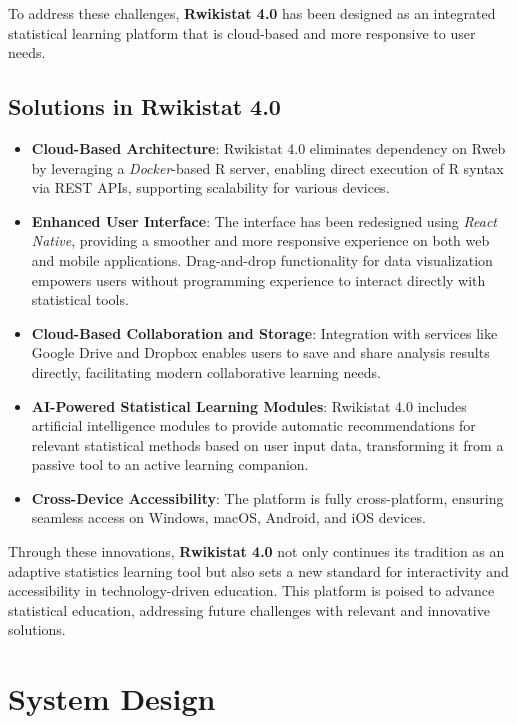 \documentclass[conference,a4paper]{IEEEtran}
\begin{document}
To address these challenges, \textbf{Rwikistat 4.0} has been designed as an
integrated statistical learning platform that is cloud-based and more
responsive to user needs.

\subsection*{Solutions in Rwikistat 4.0}
\begin{itemize}
  \item \textbf{Cloud-Based Architecture}: Rwikistat 4.0 eliminates dependency on Rweb by leveraging a \textit{Docker}-based R server, enabling direct execution of R syntax via REST APIs, supporting scalability for various devices.
  \item \textbf{Enhanced User Interface}: The interface has been redesigned using \textit{React Native}, providing a smoother and more responsive experience on both web and mobile applications. Drag-and-drop functionality for data visualization empowers users without programming experience to interact directly with statistical tools.
  \item \textbf{Cloud-Based Collaboration and Storage}: Integration with services like Google Drive and Dropbox enables users to save and share analysis results directly, facilitating modern collaborative learning needs.
  \item \textbf{AI-Powered Statistical Learning Modules}: Rwikistat 4.0 includes artificial intelligence modules to provide automatic recommendations for relevant statistical methods based on user input data, transforming it from a passive tool to an active learning companion.
  \item \textbf{Cross-Device Accessibility}: The platform is fully cross-platform, ensuring seamless access on Windows, macOS, Android, and iOS devices.
\end{itemize}

Through these innovations, \textbf{Rwikistat 4.0} not only continues its
tradition as an adaptive statistics learning tool but also sets a new standard
for interactivity and accessibility in technology-driven education. This
platform is poised to advance statistical education, addressing future
challenges with relevant and innovative solutions.

\section{System Design}
\label{sect:system_design}
\end{document}
